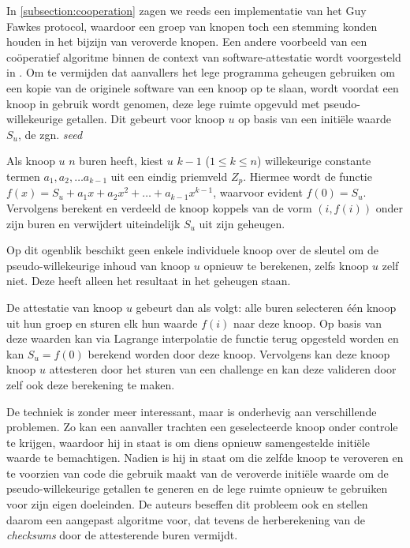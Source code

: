 In \ref{subsection:cooperation} zagen we reeds een implementatie van het Guy
Fawkes protocol, waardoor een groep van knopen toch een stemming konden houden
in het bijzijn van veroverde knopen. Een andere voorbeeld van een co\"operatief
algoritme binnen de context van software-attestatie wordt voorgesteld in
\citep{yang2007distributed}. Om te vermijden dat aanvallers het lege programma
geheugen gebruiken om een kopie van de originele software van een knoop op te
slaan, wordt voordat een knoop in gebruik wordt genomen, deze lege ruimte
opgevuld met pseudo-willekeurige getallen. Dit gebeurt voor knoop $u$ op basis
van een initi\"ele waarde $S_u$, de zgn. \emph{seed}

Als knoop $u$ $n$ buren heeft, kiest $u$ $k - 1$ ($1 \leq k \leq n$)
willekeurige constante termen $a_1, a_2,\dots a_{k-1}$ uit een eindig
priemveld $Z_p$. Hiermee wordt de functie $f(x) = S_u + a_1 x+a_2 x^2 +\dots +
a_{k-1} x^{k-1}$, waarvoor evident $f(0) = S_u$. Vervolgens berekent en
verdeeld de knoop koppels van de vorm $(i,f(i))$ onder zijn buren en verwijdert
uiteindelijk $S_u$ uit zijn geheugen.

Op dit ogenblik beschikt geen enkele individuele knoop over de sleutel om de
pseudo-willekeurige inhoud van knoop $u$ opnieuw te berekenen, zelfs knoop $u$
zelf niet. Deze heeft alleen het resultaat in het geheugen staan.

De attestatie van knoop $u$ gebeurt dan als volgt: alle buren selecteren
\'e\'en knoop uit hun groep en sturen elk hun waarde $f(i)$ naar deze knoop. Op
basis van deze waarden kan via Lagrange interpolatie de functie terug opgesteld
worden en kan $S_u = f(0)$ berekend worden door deze knoop. Vervolgens kan deze
knoop knoop $u$ attesteren door het sturen van een challenge en kan deze
valideren door zelf ook deze berekening te maken.

De techniek is zonder meer interessant, maar is onderhevig aan verschillende
problemen. Zo kan een aanvaller trachten een geselecteerde knoop onder controle
te krijgen, waardoor hij in staat is om diens opnieuw samengestelde initi\"ele
waarde te bemachtigen. Nadien is hij in staat om die zelfde knoop te veroveren
en te voorzien van code die gebruik maakt van de veroverde initi\"ele waarde om
de pseudo-willekeurige getallen te generen en de lege ruimte opnieuw te
gebruiken voor zijn eigen doeleinden. De auteurs beseffen dit probleem ook en
stellen daarom een aangepast algoritme voor, dat tevens de herberekening van de
\emph{checksums} door de attesterende buren vermijdt.


